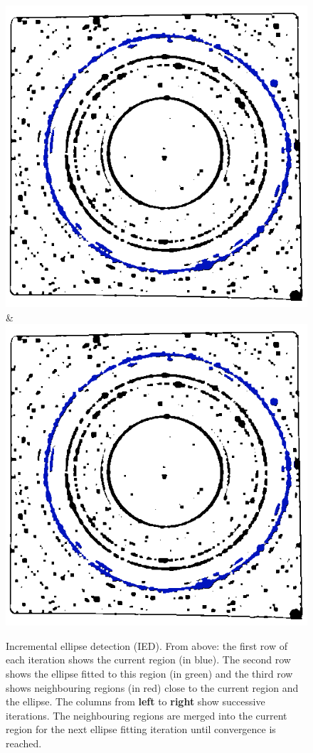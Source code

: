 \documentclass[preprint]{iucr}              %
\begin{document}
\begin{figure}
\begin{tabular}
\includegraphics[width=\linewidth]{Detail/o_Si12_0002_R_2_6.png}&
\includegraphics[width=\linewidth]{Detail/o_Si12_0002_RF_2_7.png}
\end{tabular}
\caption{Incremental ellipse detection (IED). 
From above: the first row of each iteration shows the current region (in blue). 
The second row shows the ellipse fitted to this region (in green) and the third
row shows neighbouring regions (in red) close to the current region and the
ellipse. The columns from \textbf{left} to \textbf{right} show successive
iterations.   
The neighbouring regions are merged into the current region for the next ellipse
fitting iteration until convergence is reached.} 

\label{fig:working}
\end{figure}
\end{document}
